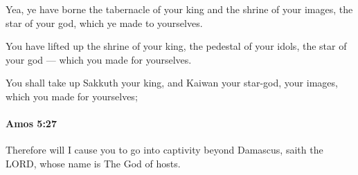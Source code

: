 			\begin{versebox}
					\item[BHS] 
					\item[LXX] 
					\item[ASV] Yea, ye have borne the tabernacle of your king and the shrine of your images, the star of your god, which ye made to yourselves.
					\item[NIV] You have lifted up the shrine of your king, the pedestal of your idols, the star of your god — which you made for yourselves.
					\item[NRSV] You shall take up Sakkuth your king, and Kaiwan your star-god, your images, which you made for yourselves;
			\end{versebox}

		\paragraph{Amos 5:27} %
			\label{AMOS-5-27}

			Therefore will I cause you to go into captivity beyond Damascus, saith the LORD, whose name is The God of hosts.

